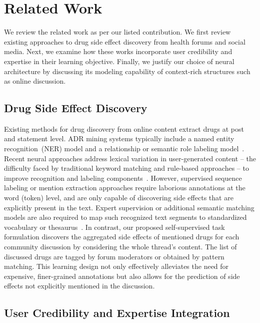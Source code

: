 \documentclass{bmcart}
\begin{document}
\section{Related Work}

We review the related work as per our listed contribution. We first review existing approaches to drug side effect discovery from health forums and social media. Next, we examine how these works incorporate user credibility and expertise in their learning objective. Finally, we justify our choice of neural architecture by discussing its modeling capability of context-rich structures such as online discussion.

\subsection{Drug Side Effect Discovery}

Existing methods for drug discovery from online content extract drugs at post and statement level. ADR mining systems typically include 
a named entity recognition~(NER) model and a relationship or semantic role labeling model~\cite{sampathkumar2014mining,liu2018patient}. 
Recent neural approaches address lexical variation in user-generated content -- the difficulty faced by traditional keyword matching and rule-based approaches -- to improve recognition and labeling components~\cite{ding2018attentive,wunnava2019adverse}. However, supervised sequence labeling or mention extraction approaches require laborious annotations at the word (token) level, and are only capable of discovering side effects that are explicitly present in the text. Expert supervision or additional semantic matching models are also required to map such recognized text segments to standardized vocabulary or thesaurus~\cite{yates2015extracting}. In contrast, our proposed self-supervised task formulation discovers the aggregated side effects of mentioned drugs for each community discussion by considering the whole thread's content. The list of discussed drugs are tagged by forum moderators or obtained by pattern matching. This learning design not only effectively alleviates the need for expensive, finer-grained annotations but also allows for the prediction of side effects not explicitly mentioned in the discussion.

\subsection{User Credibility and Expertise Integration}
\end{document}
